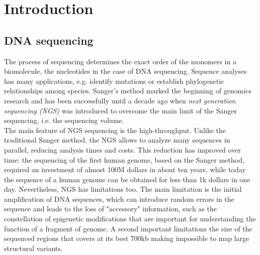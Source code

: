 
\chapter{Introduction} %

\label{Chapter2} %





\section{DNA sequencing}




The process of sequencing determines the exact order of the monomers in a biomolecule, the nucleotides in the case of DNA sequencing. Sequence analyses has many applications, e.g. identify mutations or establish phylogenetic relationships among species. Sanger's method marked the beginning of genomics research and has been successfully until a decade ago when \textit{next generation sequencing (NGS)} was introduced to overcome the main limit of the Sanger sequencing, i.e. the sequencing volume.\\

The main feature of NGS sequencing is the high-throughput. Unlike the traditional Sanger method, the NGS allows to analyze many sequences in parallel, reducing analysis times and costs. This reduction has improved over time: the sequencing of the first human genome, based on the Sanger method, required an investment of almost 100M dollars in about ten years, while today the sequence of a human genome can be obtained for less than 1k dollars in one day. Nevertheless, NGS has limitations too. The main limitation is the initial amplification of DNA sequences, which can introduce random errors in the sequence and leads to the loss of "accessory" information, such as the constellation of epigenetic modifications that are important for understanding the function of a fragment of genome. A second important limitations the size of the sequenced regions that covers at its best 700kb making impossible to map large structural variants.\\

